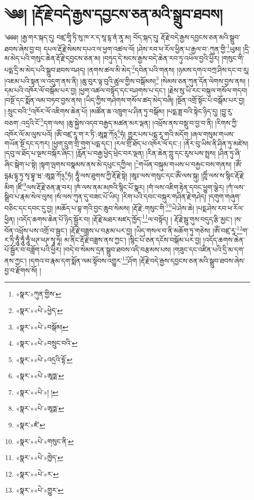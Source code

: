 \chapter{༄༅། །རྡོ་རྗེ་བདེ་རྒྱས་དབྱངས་ཅན་མའི་སྒྲུབ་ཐབས།}༄༅༅། །རྒྱ་གར་སྐད་དུ། བཛྲ་གཱི་ཏི་སུ་ཁ་ར་ད་སཱ་དྷ་ནཾ་ནཱ་མ། བོད་སྐད་དུ། རྡོ་རྗེ་བདེ་རྒྱས་དབྱངས་ཅན་མའི་སྒྲུབ་ཐབས་ཞེས་བྱ་བ། དཔལ་རྡོ་རྗེ་སེམས་དཔའ་ལ་ཕྱག་འཚལ་ལོ། །ཤེས་རབ་ཕ་རོལ་ཕྱིན་པ་རྒྱལ་བ་:ཀུན་གྱི་\footnote{«སྣར་»ཀུན་གྱིས་}ཡུམ། །དྲི་མ་མེད་པའི་གསུང་ཆེན་རྡོ་རྗེ་དབྱངས་ཅན་མ། །བཏུད་དེ་སངས་རྒྱས་བདེ་ཆེན་རབ་ཏུ་འཕེལ་བྱའི་ཕྱིར། །གསུང་གི་པདྨ་དྲི་མ་མེད་པའི་སྒྲུབ་ཐབས་བཤད། །ནགས་ཚལ་མི་མེད་\footnote{«སྣར་»«པེ་»ཕྱེད་}དབེན་པའི་གནས། །ཉམས་དགའ་བཀྲ་ཤིས་དང་བ་རུ། །འཇམ་པའི་སྟན་ལ་འདུག་ནས་ནི། །ཆུ་བུར་ལྟ་བུའི་ཚུལ་གྱིས་བསྒོམས།\footnote{«སྣར་»«པེ་»བསྒོམ།} །སེམས་ཅན་ཀུན་དོན་ལེགས་བྱས་ནས། །དམ་པའི་འཁོར་ལོ་བསྒོམ་པར་བྱ། །ཕྱག་འཚལ་བསྟོད་དང་བཤགས་པ་དང་། །རྗེས་སུ་ཡི་རང་བསྐུལ་གསོལ་གདབ། །བསྔོ་དང་སྨོན་ལམ་བཏབ་བྱས་ནས། །ཡིད་ཀྱིས་གཤེགས་གསོལ་ཚད་མེད་བཞི། །སྔོན་འགྲོ་སྟོང་པ་བསྒོམ་པར་བྱ། །:སྲུང་བའི་\footnote{«སྣར་»«པེ་»བསྲུང་བའི་}འཁོར་ལོ་འཇིགས་ཆེན་པོ། །མཚོན་ཆ་འཁྲུག་པ་ཤིན་ཏུ་བསྒོམ། །པདྨ་ཟླ་བའི་སྟེང་ཉིད་དུ། །བྱུ་རུ་བཅག་:འདྲའི་ངོ་\footnote{«སྣར་»«པེ་»འདྲའི་དྷོ་}དག་ལས། །ཆུ་སྐྱེས་འདབ་བརྒྱད་མཚན་མར་ལྡན། །འཕྲོས་ནས་བསྡུ་བ་བྱ་བ་ནི། །རིགས་ཀྱི་འཁོར་ལོ་མ་ལུས་པའོ། །ཨོཾ་བཛྲ་རཱ་ག་ར་ཏི་:ཨཱཏྨ་ཀོ྅\footnote{«སྣར་»«པེ་»ཨཱཏྨ་}ཧཾ། གྱུར་པས་པདྨ་རཱ་གའི་མདོག །ཞལ་གསུམ་གཡས་གཡོན་སྔོ་དང་དཀར། །ཕྱག་དྲུག་གྲི་གུག་པདྨ་དང་། །རལ་གྲི་ཐོད་པ་འཁོར་ལོ་དང་:། །ནོར་བུ་ཡིས་ནི་ཤིན་ཏུ་མཛེས། །དབུ་ལ་ཐོད་པ་ལྔས་བསྐོར་ཞིང་། །རློན་པ་བརྒྱ་ཕྱེད་ཕྲེང་བར་ལྡན། །རིན་ཆེན་ཀླུ་དང་རུས་པས་སྤྲས། །ཤིན་ཏུ་ཞི་ཞིང་སྒེག་པ་སྟེ། །སྟག་ལྤགས་བསྣམས་ནས་མེ་དཔུང་དཀྱིལ། །\footnote{«སྣར་»«པེ་»། །}གཡོན་བསྐུམ་གཡས་པ་བརྐྱང་བས་གནས། །ཨོཾ་དྷརྨ་དྷཱ་ཏུ་སྭ་བྷཱ་ཝ་:ཨཱཏྨ་ཀོ྅\footnote{«སྣར་»«པེ་»ཨཱཏྨ་}ཧཾ། ཧཱུྃ་ལས་ཐུགས་ཀྱི་རྡོ་རྗེ་སྟེ། །ཨཱཿ་ལས་གསུང་དང་ཨོཾ་ལས་སྐུ། །ཀྵིཾ་ལས་ས་སྙིང་རྡོ་རྗེ་མིག །ཛིཾ་\footnote{«སྣར་»ཛཾ་}ལས་རྡོ་རྗེ་ཅན་རྣ་བར། །ཁཾ་ལས་ནམ་མཁའི་སྙིང་པོ་སྣར། །གཾ་ལས་འཇིག་རྟེན་དབང་ཕྱུག་ལྕེར། །ཀཾ་ལས་སྒྲིབ་པ་རྣམ་སེལ་ལུས། །སཾ་ལས་ཀུན་དུ་བཟང་པོ་ཡིད། །རིག་པའི་དབང་བསྐུར་གཤིན་རྗེ་གཤེད། །དགུག་གཞུག་བཅིང་དང་དབང་དུ་བྱ། །མཆོད་པ་བྷ་གའི་བྱང་ཆུབ་སེམས། །རྡོ་རྗེ་:གསུང་གི་\footnote{«སྣར་»«པེ་»གསུང་ནི་}ཡེ་ཤེས་ཆེ། །པདྨ་ཤེས་རབ་ཕ་རོལ་ཕྱིན། །འདོད་ཆགས་ཆེན་པོ་ཉིད་སྦྱོར་བ། །རྡོ་རྗེ་མཐར་མཛད་ཁྱོད་\footnote{«སྣར་»«པེ་»ཁྱེད་}ལ་བསྟོད། །
རྡོ་རྗེ་སྦུ་གུས་བདུད་རྩི་མྱང་། །ས་བོན་འཕྲོས་པས་འགྲོ་བ་སྦྱང་། །རྡོ་རྗེ་བཟླས་པ་བརྩམ་པར་བྱ། །ཡིད་གསལ་བ་ནི་མཆོག་ཏུ་གཅེས། །ཨོཾ་བཛྲ་རཱ་\footnote{«སྣར་»«པེ་»ར་}ག་ར་ཏི་ཧཱུྃ་ཧཱུྃ་ཧཱུྃ་ཕཊ་ཕཊ་སྭཱ་ཧཱ། མ་ནིང་རྡོ་རྗེ་བཟླས་ནས་ཀྱང་། །སྙིང་པོ་ཅན་དངོས་བསྒོམ་པར་བྱ། །འདོད་ཆགས་ཆེན་པོ་སྦྱོར་བ་བཟློག་པའི་ཕྱིར། །བདེ་བ་སེམས་དྲན་སྒྲུབ་ཐབས་འདི་བརྩམས་པས། །གཟུང་དང་འཛིན་པའི་དྲི་མ་དག་ནས་ཀྱང་། །དགའ་བ་རྣམ་དག་སྨོན་ལམ་སྟོབས་འགྱུར་\footnote{«སྣར་»«པེ་»གྱུར་}ཤོག །རྡོ་རྗེ་བདེ་རྒྱས་དབྱངས་ཅན་མའི་སྒྲུབ་ཐབས་ཞེས་བྱ་བ་རྫོགས་སོ། ། 
